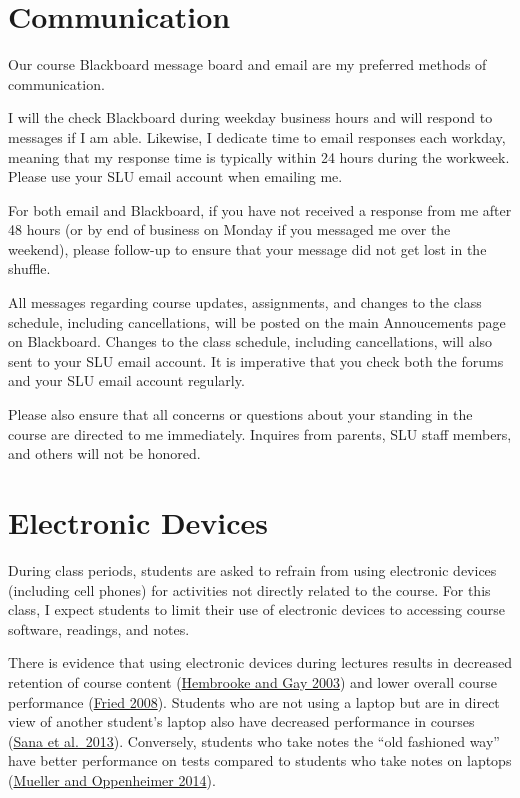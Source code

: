 \documentclass[
]{book}
\begin{document}
\hypertarget{communication}{%
\section{Communication}\label{communication}}

Our course Blackboard message board and email are my preferred methods of communication.

I will the check Blackboard during weekday business hours and will respond to messages if I am able. Likewise, I dedicate time to email responses each workday, meaning that my response time is typically within 24 hours during the workweek. Please use your SLU email account when emailing me.

For both email and Blackboard, if you have not received a response from me after 48 hours (or by end of business on Monday if you messaged me over the weekend), please follow-up to ensure that your message did not get lost in the shuffle.

All messages regarding course updates, assignments, and changes to the class schedule, including cancellations, will be posted on the main Annoucements page on Blackboard. Changes to the class schedule, including cancellations, will also sent to your SLU email account. It is imperative that you check both the forums and your SLU email account regularly.

Please also ensure that all concerns or questions about your standing in the course are directed to me immediately. Inquires from parents, SLU staff members, and others will not be honored.

\hypertarget{electronic-devices}{%
\section{Electronic Devices}\label{electronic-devices}}

During class periods, students are asked to refrain from using electronic devices (including cell phones) for activities not directly related to the course. For this class, I expect students to limit their use of electronic devices to accessing course software, readings, and notes.

There is evidence that using electronic devices during lectures results in decreased retention of course content (\href{https://link.springer.com/article/10.1007/BF02940852}{Hembrooke and Gay 2003}) and lower overall course performance (\href{https://www.sciencedirect.com/science/article/pii/S0360131506001436}{Fried 2008}). Students who are not using a laptop but are in direct view of another student's laptop also have decreased performance in courses (\href{https://www.sciencedirect.com/science/article/pii/S0360131512002254}{Sana et al.~2013}). Conversely, students who take notes the ``old fashioned way'' have better performance on tests compared to students who take notes on laptops (\href{http://journals.sagepub.com/doi/abs/10.1177/0956797614524581}{Mueller and Oppenheimer 2014}).
\end{document}
